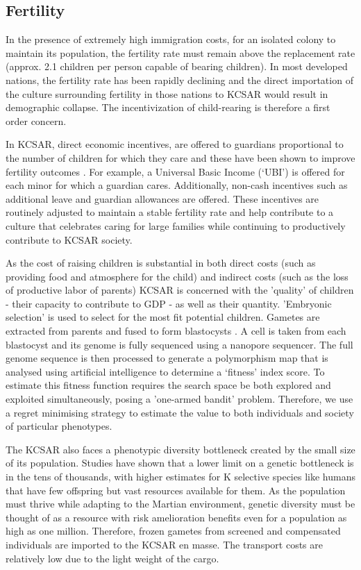 \documentclass[fleqn,10pt]{Stylesheet} %
\begin{document}
\subsection{Fertility}
\label{sec:fertility}
In the presence of extremely high immigration costs, for an isolated colony to maintain its population, the fertility rate must remain above the replacement rate (approx. 2.1 children per person capable of bearing children). In most developed nations, the fertility rate has been rapidly declining and the direct importation of the culture surrounding fertility in those nations to KCSAR would result in demographic collapse. The incentivization of child-rearing is therefore a first order concern.

In KCSAR, direct economic incentives, are offered to guardians proportional to the number of children for which they care and these have been shown to improve fertility outcomes \cite{Kalwij, Bjorklund}. For example, a Universal Basic Income (`UBI') is offered for each minor for which a guardian cares. Additionally, non-cash incentives such as additional leave and guardian allowances are offered. These incentives are routinely adjusted to maintain a stable fertility rate and help contribute to a culture that celebrates caring for large families while continuing to productively contribute to KCSAR society.

As the cost of raising children is substantial in both direct costs (such as providing food and atmosphere for the child) and indirect costs (such as the loss of productive labor of parents) KCSAR is concerned with the 'quality' of children - their capacity to contribute to GDP - as well as their quantity. 'Embryonic selection' is used to select for the most fit potential children. Gametes are extracted from parents and fused to form blastocysts \cite{Shulman}. A cell is taken from each blastocyst and its genome is fully sequenced using a nanopore sequencer. The full genome sequence is then processed to generate a polymorphism map that is analysed using artificial intelligence to determine a ‘fitness’ index score. To estimate this fitness function requires the search space be both explored and exploited simultaneously, posing a 'one-armed bandit' problem. Therefore, we use a regret minimising strategy to estimate the value to both individuals and society of particular phenotypes.

The KCSAR also faces a phenotypic diversity bottleneck created by the small size of its population. Studies have shown that a lower limit on a genetic bottleneck is in the tens of thousands, with higher estimates for K selective species like humans that have few offspring but vast resources available for them. As the population must thrive while adapting to the Martian environment, genetic diversity must be thought of as a resource with risk amelioration benefits even for a population as high as one million. Therefore, frozen gametes from screened and compensated individuals are imported to the KCSAR en masse. The transport costs are relatively low due to the light weight of the cargo.
\end{document}
